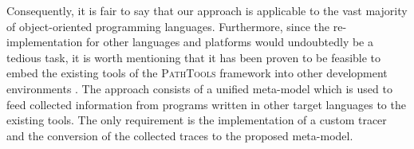 Consequently, it is fair to say that our approach is applicable to the vast majority of object-oriented programming languages.
Furthermore, since the re-implementation for other languages and platforms would undoubtedly be a tedious task, it is worth mentioning that it has been proven to be feasible to embed the existing tools of the \textsc{PathTools} framework into other development environments \cite{richter_integration_2013}.
The approach consists of a unified meta-model which is used to feed collected information from programs written in other target languages to the existing tools.
The only requirement is the implementation of a custom tracer and the conversion of the collected traces to the proposed meta-model.